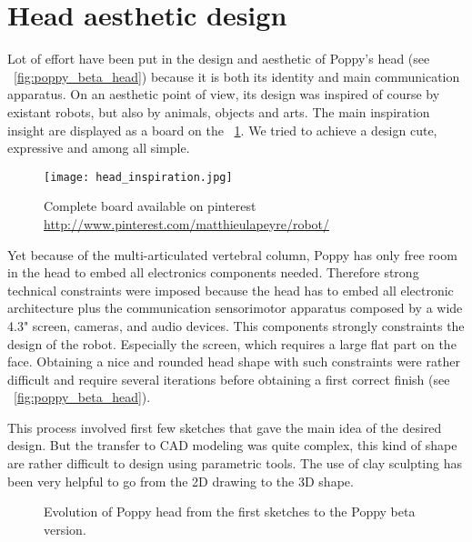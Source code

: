 
\section{Head aesthetic design} %
\label{sec:head-design}
Lot of effort have been put in the design and aesthetic of Poppy's head (see \figurename~\ref{fig:poppy_beta_head}) because it is  both its identity and main communication apparatus.
On an aesthetic point of view, its design was inspired of course by existant robots, but also by animals, objects and arts. The main inspiration insight are displayed as a board on the \figurename~\ref{fig:head_inspiration}. We tried to achieve a design cute, expressive and among all simple.

\begin{figure}[p]
    \begin{center}
        \texttt{[image: head\_inspiration.jpg]}
    \end{center}
    \caption{Complete board available on pinterest \url{http://www.pinterest.com/matthieulapeyre/robot/}}
    \label{fig:head_inspiration}
\end{figure}

Yet because of the multi-articulated vertebral column, Poppy has only free room in the head to embed all electronics components needed. Therefore strong technical constraints were imposed because the head has to embed all electronic architecture plus the communication sensorimotor apparatus composed by a wide 4.3" screen, cameras, and audio devices.
This components strongly constraints the design of the robot. Especially the screen, which requires a large flat part on the face. Obtaining a nice and rounded head shape with such constraints were rather difficult and require several iterations before obtaining a first correct finish (see \figurename~\ref{fig:poppy_beta_head}).

This process involved first few sketches that gave the main idea of the desired design. But the transfer to CAD modeling was quite complex, this kind of shape are rather difficult to design using parametric tools. The use of clay sculpting has been very helpful to go from the 2D drawing to the 3D shape.

\begin{figure}[p]
\centering
    \hfil
    \newline
    \hfil
    \newline
    \hfil
    \caption{Evolution of Poppy head from the first sketches to the Poppy beta version.}
    \label{fig:head_sketch}
\end{figure}


